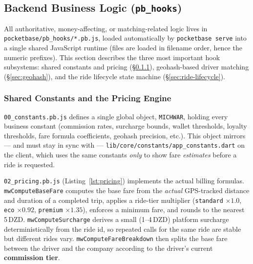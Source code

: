 \documentclass[11pt,a4paper]{article}
\begin{document}
\subsection{Backend Business Logic (\texttt{pb\_hooks})}
\label{sec:hooks}

All authoritative, money-affecting, or matching-related logic lives in
\texttt{pocketbase/pb\_hooks/*.pb.js}, loaded automatically by
\texttt{pocketbase serve} into a single shared JavaScript runtime (files are
loaded in filename order, hence the numeric prefixes). This section
describes the three most important hook subsystems: shared constants and
pricing (\S\ref{sec:pricing}), geohash-based driver matching
(\S\ref{sec:geohash}), and the ride lifecycle state machine
(\S\ref{sec:ride-lifecycle}).

\subsubsection{Shared Constants and the Pricing Engine}
\label{sec:pricing}

\texttt{00\_constants.pb.js} defines a single global object, \texttt{MICHWAR},
holding every business constant (commission rates, surcharge bounds, wallet
thresholds, loyalty thresholds, fare formula coefficients, geohash
precision, etc.). This object mirrors --- and must stay in sync with ---
\texttt{lib/core/constants/app\_constants.dart} on the client, which uses the
same constants \textit{only} to show fare \textit{estimates} before a ride
is requested.

\texttt{02\_pricing.pb.js} (Listing~\ref{lst:pricing}) implements the actual
billing formulas. \texttt{mwComputeBaseFare} computes the base fare from the
\textit{actual} GPS-tracked distance and duration of a completed trip,
applies a ride-tier multiplier (\texttt{standard} $\times 1.0$, \texttt{eco}
$\times 0.92$, \texttt{premium} $\times 1.35$), enforces a minimum fare, and
rounds to the nearest 5\,DZD. \texttt{mwComputeSurcharge} derives a small
(1--4\,DZD) platform surcharge deterministically from the ride id, so
repeated calls for the same ride are stable but different rides vary.
\texttt{mwComputeFareBreakdown} then splits the base fare between the driver
and the company according to the driver's current \textbf{commission tier}.
\end{document}
